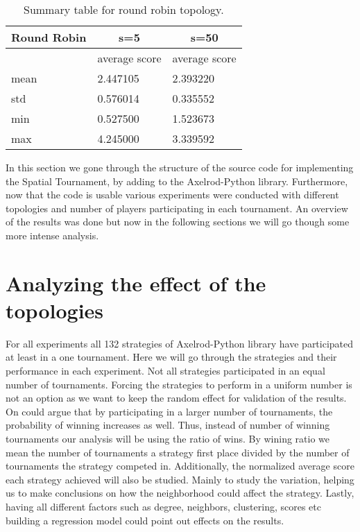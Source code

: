 \begin{table}[]
\centering
\begin{tabular}{|l|l|l|}
\hline
Round Robin & \multicolumn{1}{c|}{s=5} & \multicolumn{1}{c|}{s=50} \\ \hline
            & average score            & average score             \\ \hline
mean        & 2.447105                 & 2.393220                  \\ \hline
std         & 0.576014                 & 0.335552                  \\ \hline
min         & 0.527500                 & 1.523673                  \\ \hline
max         & 4.245000                 & 3.339592                  \\ \hline
\end{tabular}
\caption{Summary table for round robin topology.}
\label{sum-rr}
\end{table}

\newpage
In this section we gone through the structure of the source code for implementing
the Spatial Tournament, by adding to the Axelrod-Python library. Furthermore, now
that the code is usable various experiments were conducted with different topologies
and number of players participating in each tournament. An overview of the results
was done but now in the following sections we will go though some more intense
analysis.

\section{Analyzing the effect of the topologies}
\label{sub:effects}

For all experiments all 132 strategies of Axelrod-Python library have participated
at least in a one tournament. Here we will go through the strategies and their
performance in each experiment. Not all strategies participated in an equal number
of tournaments. Forcing the strategies to perform in a uniform number is not an
option as we want to keep the random effect for validation of the results.
On could argue that by participating in a larger number of tournaments, the
probability of winning increases as well. Thus, instead of number of winning
tournaments our analysis will be using the ratio of wins. By wining ratio we mean
the number of tournaments a strategy first place divided by the number of tournaments
the strategy competed in. Additionally, the normalized average score each strategy
achieved will also be studied. Mainly to study the variation, helping us to make
conclusions on how the neighborhood could affect the strategy.
Lastly, having all different factors such as degree, neighbors, clustering, scores
etc building a regression model could point out effects on the results.

